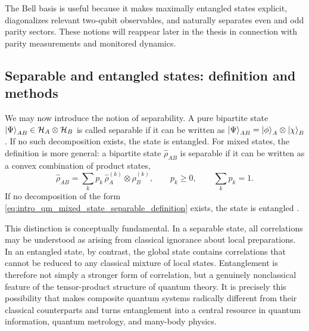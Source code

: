 The Bell basis is useful because it makes maximally entangled states explicit, diagonalizes relevant two-qubit observables, and naturally separates even and odd parity sectors. These notions will reappear later in the thesis in connection with parity measurements and monitored dynamics.


\subsection{Separable and entangled states: definition and methods}

We may now introduce the notion of separability. A pure bipartite state $\ket{\Psi}_{AB}\in\mathcal{H}_A\otimes\mathcal{H}_B$ is called separable if it can be written as $\ket{\Psi}_{AB}=\ket{\phi}_A\otimes\ket{\chi}_B$. If no such decomposition exists, the state is entangled. For mixed states, the definition is more general: a bipartite state $\hat \rho_{AB}$ is separable if it can be written as a convex combination of product states,
\begin{equation}
	\hat \rho_{AB}
	=
	\sum_k p_k \,\hat \rho_A^{(k)}\otimes \hat \rho_B^{(k)},
	\qquad
	p_k\geq 0,
	\qquad
	\sum_k p_k=1.
	\label{eq:intro_qm_mixed_state_separable_definition}
\end{equation}
If no decomposition of the form \eqref{eq:intro_qm_mixed_state_separable_definition} exists, the state is entangled \cite{Horodecki3_96}.

This distinction is conceptually fundamental. In a separable state, all correlations may be understood as arising from classical ignorance about local preparations. In an entangled state, by contrast, the global state contains correlations that cannot be reduced to any classical mixture of local states. Entanglement is therefore not simply a stronger form of correlation, but a genuinely nonclassical feature of the tensor-product structure of quantum theory. It is precisely this possibility that makes composite quantum systems radically different from their classical counterparts and turns entanglement into a central resource in quantum information, quantum metrology, and many-body physics.

